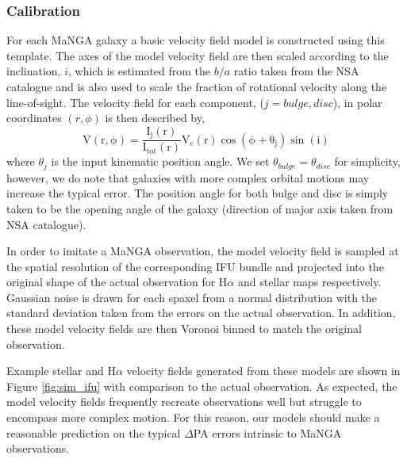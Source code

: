\subsubsection{Calibration}
For each MaNGA galaxy a basic velocity field model is constructed using this template. The axes of the model velocity field are then scaled according to the inclination, $i$, which is estimated from the $b/a$ ratio taken from the NSA catalogue and is also used to scale the fraction of rotational velocity along the line-of-sight. The velocity field for each component, ($j=bulge,disc$), in polar coordinates $(r,\phi)$ is then described by,
\begin{equation}
\mathrm{V(r,\phi) = \frac{I_{j}(r)}{I_{tot}(r)}V_{c}(r)\cos(\phi+\theta_{j})\sin(i)}
\end{equation}
where $\theta_j$ is the input kinematic position angle. We set $\theta_{bulge} = \theta_{disc}$ for simplicity, however, we do note that galaxies with more complex orbital motions may increase the typical error. The position angle for both bulge and disc is simply taken to be the opening angle of the galaxy (direction of major axis taken from NSA catalogue). 

In order to imitate a MaNGA observation, the model velocity field is sampled at the spatial resolution of the corresponding IFU bundle and projected into the original shape of the actual observation for H$\alpha$ and stellar maps respectively. Gaussian noise is drawn for each spaxel from a normal distribution with the standard deviation taken from the errors on the actual observation. In addition, these model velocity fields are then Voronoi binned to match the original observation.

Example stellar and H$\alpha$ velocity fields generated from these models are shown in Figure \ref{fig:sim_ifu} with comparison to the actual observation. As expected, the model velocity fields frequently recreate observations well but struggle to encompass more complex motion. For this reason, our models should make a reasonable prediction on the typical $\Delta$PA errors intrinsic to MaNGA observations.

